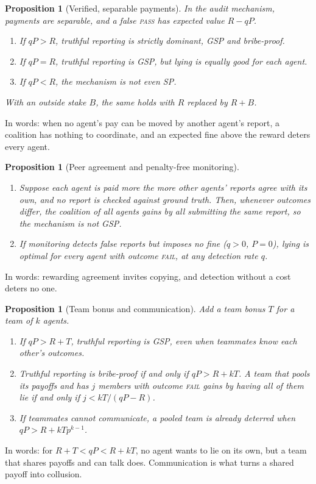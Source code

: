 \documentclass[11pt]{article}
\newtheorem{proposition}[theorem]{Proposition}
\theoremstyle{definition}
\theoremstyle{remark}
\newcommand{\PASS}{\textnormal{\textsc{pass}}}
\newcommand{\FAIL}{\textnormal{\textsc{fail}}}
\begin{document}
\begin{proposition}[Verified, separable payments]\label{obs:base}
In the audit mechanism, payments are separable, and a false \PASS{} has expected value
$R-qP$.
\begin{enumerate}[label=(\alph*)]
    \item If $qP>R$, truthful reporting is strictly dominant, GSP and bribe-proof.
    \item If $qP=R$, truthful reporting is GSP, but lying is equally good for each agent.
    \item If $qP<R$, the mechanism is not even SP.
\end{enumerate}
With an outside stake $B$, the same holds with $R$ replaced by $R+B$.
\end{proposition}
\noindent In words: when no agent's pay can be moved by another agent's report, a coalition
has nothing to coordinate, and an expected fine above the reward deters every agent.

\begin{proposition}[Peer agreement and penalty-free monitoring]\label{obs:peer}
\begin{enumerate}[label=(\alph*)]
    \item Suppose each agent is paid more the more other agents' reports agree with its own,
    and no report is checked against ground truth. Then, whenever outcomes differ, the
    coalition of all agents gains by all submitting the same report, so the mechanism is not
    GSP.
    \item If monitoring detects false reports but imposes no fine ($q>0$, $P=0$), lying is
    optimal for every agent with outcome \FAIL{}, at any detection rate $q$.
\end{enumerate}
\end{proposition}
\noindent In words: rewarding agreement invites copying, and detection without a cost
deters no one.

\begin{proposition}[Team bonus and communication]\label{obs:team}
Add a team bonus $T$ for a team of $k$ agents.
\begin{enumerate}[label=(\alph*)]
    \item If $qP>R+T$, truthful reporting is GSP, even when teammates know each other's
    outcomes.
    \item Truthful reporting is bribe-proof if and only if $qP>R+kT$. A team that pools its
    payoffs and has $j$ members with outcome \FAIL{} gains by having all of them lie if and
    only if $j<kT/(qP-R)$.
    \item If teammates cannot communicate, a pooled team is already deterred when
    $qP>R+kTp^{k-1}$.
\end{enumerate}
\end{proposition}
\noindent In words: for $R+T<qP<R+kT$, no agent wants to lie on its own, but a team that
shares payoffs and can talk does. Communication is what turns a shared payoff into
collusion.
\end{document}
